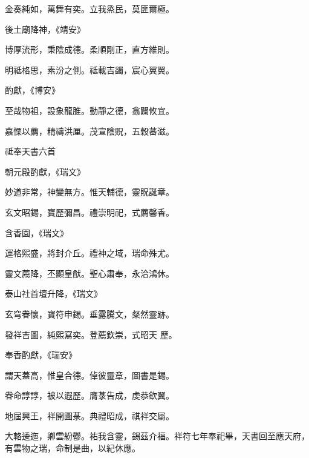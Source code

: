 \begin{pinyinscope}
 金奏純如，萬舞有奕。立我烝民，莫匪爾極。



 後土廟降神，《靖安》



 博厚流形，秉陰成德。柔順剛正，直方維則。



 明祗格思，素汾之側。祗載吉蠲，宸心翼翼。



 酌獻，《博安》



 至哉物祖，設象龍脽。動靜之德，翕闢攸宜。



 嘉慄以薦，精禱洪厘。茂宣陰貺，五穀蕃滋。



 祗奉天書六首



 朝元殿酌獻，《瑞文》



 妙道非常，神變無方。惟天輔德，靈貺誕章。



 玄文昭錫，寶歷彌昌。禮崇明祀，式薦馨香。



 含香園，《瑞文》



 運格熙盛，將封介丘。禮神之域，瑞命殊尤。



 靈文薦降，丕顯皇猷。聖心肅奉，永洽鴻休。



 泰山社首壇升降，《瑞文》



 玄穹眷懷，寶符申錫。垂露騰文，粲然靈跡。



 發祥吉圖，純熙寫奕。登薦欽崇，式昭天
 歷。



 奉香酌獻，《瑞安》



 謂天蓋高，惟皇合德。倬彼靈章，圖書是錫。



 眷命諄諄，被以遐歷。膺菉告成，虔恭欽翼。



 地屆興王，祥開圖菉。典禮昭成，祺祥交屬。



 大輅逶迤，卿雲紛鬱。祐我含靈，錫茲介福。祥符七年奉祀畢，天書回至應天府，有雲物之瑞，命制是曲，以紀休應。




\end{pinyinscope}
